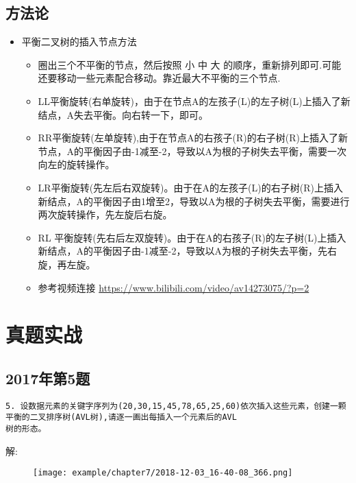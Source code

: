 \subsection{方法论}
\begin{itemize}[noitemsep,topsep=0pt,parsep=0pt,partopsep=0pt]
	\item 平衡二叉树的插入节点方法
	\begin{itemize}[noitemsep,topsep=0pt,parsep=0pt,partopsep=0pt]
		\item 圈出三个不平衡的节点，然后按照 小 中 大 的顺序，重新排列即可.可能还要移动一些元素配合移动。{\color{red}靠近最大不平衡的三个节点}.
		\item LL平衡旋转({\color{red}右单旋转})，由于在节点A的左孩子({\color{red}L})的左子树({\color{red}L})上插入了新结点，A失去平衡。向右转一下，即可。
		\item RR平衡旋转({\color{red}左单旋转}),由于在节点A的右孩子(R)的右子树(R)上插入了新节点，A的平衡因子由-1减至-2，导致以A为根的子树失去平衡，需要一次向左的旋转操作。
		\item LR平衡旋转(先左后右双旋转)。由于在A的左孩子(L)的右子树(R)上插入新结点，A的平衡因子由1增至2，导致以A为根的子树失去平衡，需要进行两次旋转操作，先左旋后右旋。
		\item RL 平衡旋转(先右后左双旋转)。由于在A的右孩子(R)的左子树(L)上插入新结点，A的平衡因子由-1减至-2，导致以A为根的子树失去平衡，先右旋，再左旋。
		\item 参考视频连接 \url{https://www.bilibili.com/video/av14273075/?p=2}
	\end{itemize}
\end{itemize}

\section{真题实战}


\subsection{2017年第5题}

\begin{lstlisting}[basicstyle=\small\ttfamily, caption={}, numbers=none]
5. 设数据元素的关键字序列为(20,30,15,45,78,65,25,60)依次插入这些元素，创建一颗平衡的二叉排序树(AVL树),请逐一画出每插入一个元素后的AVL
树的形态。
\end{lstlisting}
解:\newline
\begin{figure}[H]
	\centering  %
	\texttt{[image: example/chapter7/2018-12-03\_16-40-08\_366.png]}
\end{figure}

